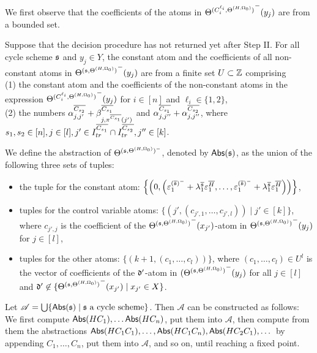 We first observe that the coefficients of the atoms in ${\Theta^{(C^{\ell_i}_{i}, \Theta^{(H,\Omega_0)})}}^-(y_j)$ are from a bounded set.
%
\begin{lemma}\label{prop-bnd-domain-2}
	Suppose that the decision procedure has not returned yet after Step II. 
	For all cycle scheme ${\mathfrak{s} }$ and $y_j \in Y$, the constant atom and the coefficients of all non-constant atoms in ${\Theta^{({\mathfrak{s} }, \Theta^{(H,\Omega_0)})}}^-(y_j)$ are from a finite set $U \subset {\mathbb{Z} }$ comprising \\ (1)
	the constant atom and the coefficients of the non-constant atoms in the expression ${\Theta^{(C^{\ell_i}_{i}, \Theta^{(H,\Omega_0)})}}^-(y_j)$ for $i\in [n]$ and $\ell_i \in \{1,2\}$,\smallskip\\(2) the numbers $\alpha^{\overline{C_{s_2}}}_{j,j'} + \beta^{\overline{C_{s_1}}}_{j,\pi^{\overline{C_{s_1}}}(j')}$ and $\alpha^{\overline{C_{s_1}}}_{j, j''} + \alpha^{\overline{C_{s_2}}}_{j,j''}$, where  $s_1,s_2 \in [n], j\in[l],j' \in I^{\overline{C_{s_1}}}_{tr} \cap I^{\overline{C_{s_2}}}_{tr},  j'' \in [k]$. 
\end{lemma}


We define the abstraction of $\Theta^{({\mathfrak{s} },\Theta^{(H,\Omega_0)})^-}$, denoted by $\mathsf{Abs}({\mathfrak{s} })$, as the union of the following three sets of tuples:
\begin{itemize}
\item the tuple for the constant atom: $\left\{\left(0, \left( \varepsilon^{(\overline{{\mathfrak{s} }})^-}_{1}+ \lambda^{\overline{{\mathfrak{s} }}}_{1} \varepsilon^{\overline{H}}_{1},\dots, \varepsilon^{(\overline{{\mathfrak{s} }})^-}_{1}+ \lambda^{\overline{{\mathfrak{s} }}}_{1} \varepsilon^{\overline{H}}_{1} \right) \right)\right\}$,
% 
\item tuples for the control variable atoms: $\{(j', (c_{j',1},\dots, c_{j', l})) \mid j' \in [k]\}$, where $c_{j', j}$ is the coefficient of the ${\Theta^{({\mathfrak{s} },\Theta^{(H,\Omega_0)})}}^-(x_{j'})$-atom in ${\Theta^{({\mathfrak{s} },\Theta^{(H,\Omega_0)})}}^-(y_{j})$ for $j\in[l]$,
% 
\item tuples for the other atoms: $\{(k+1, (c_1,\dots,c_l))\}$, where $(c_1,\dots,c_l) \in U^l$ is the vector of coefficients of the $\mathfrak{d}'$-atom in ${(\Theta^{({\mathfrak{s} },\Theta^{(H,\Omega_0)})}}^-(y_{j})$ for all $j \in [l]$ and $\mathfrak{d}'\not\in \{{\Theta^{({\mathfrak{s} },\Theta^{(H,\Omega_0)})}}^-(x_{j'})\mid x_{j'}\in X\}$.
\end{itemize}

Let $\mathscr{A}=\bigcup \{\mathsf{Abs}({\mathfrak{s} }) \mid {\mathfrak{s} } \mbox{ a cycle scheme}\}$. Then $\mathscr{A}$ can be constructed as follows: We first compute $\mathsf{Abs}(HC_1), \ldots \mathsf{Abs}(HC_n)$, put them into $\mathscr{A}$, then compute from them the abstractions $\mathsf{Abs}(HC_1C_1),\dots, \mathsf{Abs}(HC_1C_n), \mathsf{Abs}(HC_2C_1), \dots$ by appending $C_1,\dots,C_n$, put them into $\mathscr{A}$, and so on, until reaching a fixed point.

